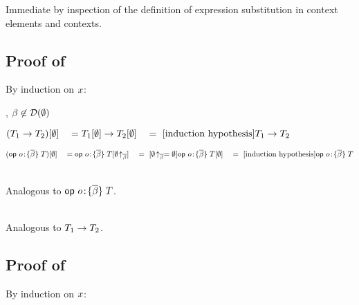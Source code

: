 Immediate by inspection of the definition of expression substitution in
context elements and contexts.



\subsection*{Proof of }

By induction on $x$:

\begin{bycase}

\Case{$\tvar$}
\StepO{\tsbs{\tvar}{\emptyset}=\tvar}
      {, $\beta\not\in\mathcal{D}(\emptyset)$}

\Case{$\bool$, $\var$, $\tdecO$, $\tvdecO$, $\mtcx$}

\Case{$\tarrO$}
\begin{links}
$(T_1\to T_2)[\emptyset]
 \\\hspace*{1em}=\\
 T_1[\emptyset]\to T_2[\emptyset]
 \\\hspace*{1em}=\ [\mbox{induction hypothesis}]\\
 T_1\to T_2$
\end{links}

\Case{$\odecO$}
\begin{links}
$\tsbs{(\odecO)}{\emptyset}
 \linK{=}
 \odec{\onam}{\tvarS}{\tsbs{\typ}{\funrestrc{\emptyset}{\tvarS}}}
 \link{=}{$\funrestrc{\emptyset}{\tvarS}=\emptyset$}
 \odec{\onam}{\tvarS}{\tsbs{\typ}{\emptyset}}
 \link{=}{\indhyp}
 \odecO$
\end{links}

\Case{$\tdefO$, $\axO$, $\lemO$}\\
Analogous to $\odecO$.

\Case{\restkinds}\\
Analogous to $\tarrO$.

\end{bycase}



\subsection*{Proof of }

By induction on $x$:

